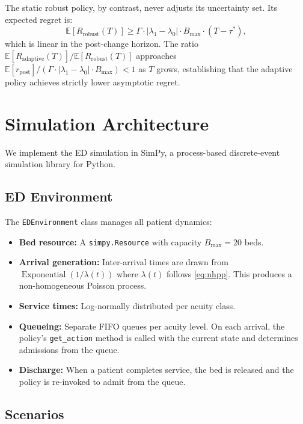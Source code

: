 \documentclass[11pt,twocolumn]{article}
\theoremstyle{plain}
\theoremstyle{definition}
\begin{document}
The static robust policy, by contrast, never adjusts its uncertainty set. Its expected regret is:
\begin{equation}
\mathbb{E}[R_{\text{robust}}(T)] \ge \Gamma \cdot |\lambda_1 - \lambda_0| \cdot B_{\max} \cdot (T - \tau^*),
\label{eq:robust-regret}
\end{equation}
which is linear in the post-change horizon. The ratio $\mathbb{E}[R_{\text{adaptive}}(T)] / \mathbb{E}[R_{\text{robust}}(T)]$ approaches $\mathbb{E}[r_{\text{post}}] / (\Gamma \cdot |\lambda_1 - \lambda_0| \cdot B_{\max}) < 1$ as $T$ grows, establishing that the adaptive policy achieves strictly lower asymptotic regret.

\clearpage
\section{Simulation Architecture}
\label{sec:simulation}

We implement the ED simulation in SimPy, a process-based discrete-event simulation library for Python.

\subsection{ED Environment}

The \texttt{EDEnvironment} class manages all patient dynamics:
\begin{itemize}
\item \textbf{Bed resource:} A \texttt{simpy.Resource} with capacity $B_{\max} = 20$ beds.
\item \textbf{Arrival generation:} Inter-arrival times are drawn from $\operatorname{Exponential}(1/\lambda(t))$ where $\lambda(t)$ follows \eqref{eq:nhpp}. This produces a non-homogeneous Poisson process.
\item \textbf{Service times:} Log-normally distributed per acuity class.
\item \textbf{Queueing:} Separate FIFO queues per acuity level. On each arrival, the policy's \texttt{get\_action} method is called with the current state and determines admissions from the queue.
\item \textbf{Discharge:} When a patient completes service, the bed is released and the policy is re-invoked to admit from the queue.
\end{itemize}

\subsection{Scenarios}
\label{sec:scenarios}
\end{document}
